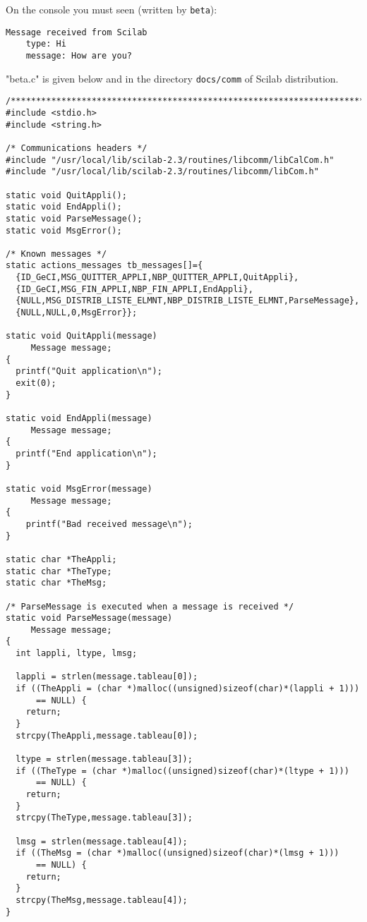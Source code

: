 \documentclass[11pt]{article}
\newcommand{\T}[1]{\texttt{#1}}
\begin{document}
On the console you must seen (written by \T{beta}):
\begin{verbatim}
Message received from Scilab
    type: Hi
    message: How are you?
\end{verbatim}

"beta.c" is given below and in the directory \T{docs/comm} of Scilab
distribution.

\begin{verbatim}
/***************************************************************************/
#include <stdio.h>
#include <string.h>

/* Communications headers */
#include "/usr/local/lib/scilab-2.3/routines/libcomm/libCalCom.h"
#include "/usr/local/lib/scilab-2.3/routines/libcomm/libCom.h"

static void QuitAppli();  
static void EndAppli();
static void ParseMessage();
static void MsgError();

/* Known messages */
static actions_messages tb_messages[]={
  {ID_GeCI,MSG_QUITTER_APPLI,NBP_QUITTER_APPLI,QuitAppli},
  {ID_GeCI,MSG_FIN_APPLI,NBP_FIN_APPLI,EndAppli},
  {NULL,MSG_DISTRIB_LISTE_ELMNT,NBP_DISTRIB_LISTE_ELMNT,ParseMessage},
  {NULL,NULL,0,MsgError}};

static void QuitAppli(message)
     Message message;
{  
  printf("Quit application\n");
  exit(0);
}

static void EndAppli(message) 
     Message message;
{
  printf("End application\n");
}

static void MsgError(message)
     Message message;
{
    printf("Bad received message\n");
}

static char *TheAppli;
static char *TheType;
static char *TheMsg;

/* ParseMessage is executed when a message is received */
static void ParseMessage(message)
     Message message;
{
  int lappli, ltype, lmsg;

  lappli = strlen(message.tableau[0]);
  if ((TheAppli = (char *)malloc((unsigned)sizeof(char)*(lappli + 1)))
      == NULL) {
    return;
  }
  strcpy(TheAppli,message.tableau[0]);

  ltype = strlen(message.tableau[3]);
  if ((TheType = (char *)malloc((unsigned)sizeof(char)*(ltype + 1)))
      == NULL) {
    return;
  }
  strcpy(TheType,message.tableau[3]);

  lmsg = strlen(message.tableau[4]);
  if ((TheMsg = (char *)malloc((unsigned)sizeof(char)*(lmsg + 1)))
      == NULL) {
    return;
  }
  strcpy(TheMsg,message.tableau[4]);
}


\end{verbatim}
\end{document}
